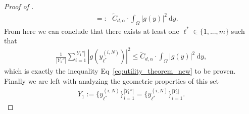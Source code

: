 \documentclass[a4paper, 10pt]{article}
\begin{document}
\begin{proof}[Proof of ]
\begin{align*}
&~~~=:~~~ \tilde{C}_{d, \alpha} \cdot \int_{\Omega} |g(y)|^2 ~ \mathrm{d}y.
\end{align*}
From here we can conclude that there exists at least one $\ell^* \in \{ 1, ..., m \}$ such that
\begin{align}
\label{eq:desired_estimate_2}
\frac{1}{|Y_1''|} \sum_{i=1}^{|Y_1''|} |g(y_{\ell^*}^{(i, N)})|^2 \leq \tilde{C}_{d, \alpha} \cdot \int_{\Omega} |g(y)|^2 ~ \mathrm{d}y,
\end{align}
which is exactly the inequality Eq~\eqref{eq:utility_theorem_new} to be proven.
Finally we are left with analyzing the geometric properties of this set 
\begin{align}
\label{eq:set_Y1}
Y_1 := \{ y_{\ell^*}^{(i,N)} \}_{i=1}^{|Y_1''|} = \{ y_{\ell^*}^{(i,N)} \}_{i=1}^{|Y_1|}.
\end{align}

%


\end{proof}
\end{document}
